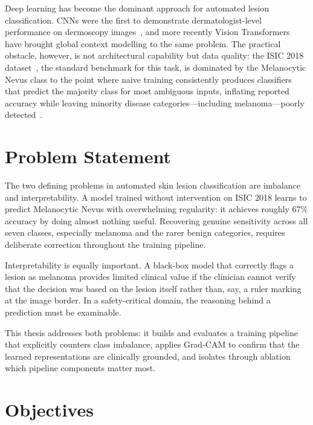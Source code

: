 \documentclass[11pt,a4paper]{report}
\begin{document}
Deep learning has become the dominant approach for automated lesion classification. CNNs were the first to demonstrate dermatologist-level performance on dermoscopy images~\cite{esteva2017dermatologist,maron2019systematic}, and more recently Vision Transformers~\cite{dosovitskiy2021image} have brought global context modelling to the same problem. The practical obstacle, however, is not architectural capability but data quality: the ISIC 2018 dataset~\cite{tschandl2018ham10000}, the standard benchmark for this task, is dominated by the Melanocytic Nevus class to the point where naive training consistently produces classifiers that predict the majority class for most ambiguous inputs, inflating reported accuracy while leaving minority disease categories---including melanoma---poorly detected~\cite{buda2018systematic}.

\section{Problem Statement}

The two defining problems in automated skin lesion classification are imbalance and interpretability. A model trained without intervention on ISIC 2018 learns to predict Melanocytic Nevus with overwhelming regularity: it achieves roughly 67\% accuracy by doing almost nothing useful. Recovering genuine sensitivity across all seven classes, especially melanoma and the rarer benign categories, requires deliberate correction throughout the training pipeline.

Interpretability is equally important. A black-box model that correctly flags a lesion as melanoma provides limited clinical value if the clinician cannot verify that the decision was based on the lesion itself rather than, say, a ruler marking at the image border. In a safety-critical domain, the reasoning behind a prediction must be examinable.

This thesis addresses both problems: it builds and evaluates a training pipeline that explicitly counters class imbalance, applies Grad-CAM to confirm that the learned representations are clinically grounded, and isolates through ablation which pipeline components matter most.

\section{Objectives}
\end{document}
